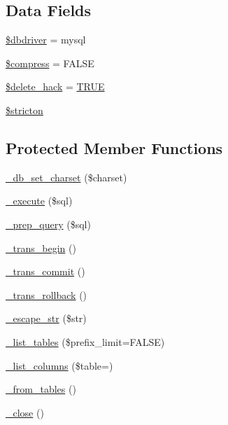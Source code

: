 \subsection*{Data Fields}
\begin{DoxyCompactItemize}
\item 
\mbox{\hyperlink{class_c_i___d_b__mysql__driver_a0cde2a16322a023d040aa7f725877597}{\$dbdriver}} = \textquotesingle{}mysql\textquotesingle{}
\item 
\mbox{\hyperlink{class_c_i___d_b__mysql__driver_abf799de0d30288b91ee73769281dd69d}{\$compress}} = F\+A\+L\+SE
\item 
\mbox{\hyperlink{class_c_i___d_b__mysql__driver_ad60008f32a478e978c7c3284f320f273}{\$delete\+\_\+hack}} = \mbox{\hyperlink{constants_8php_ae04a3efe6aa42044f803ee90c2277846}{T\+R\+UE}}
\item 
\mbox{\hyperlink{class_c_i___d_b__mysql__driver_afb42d9811bec1da94506e5764e1439e0}{\$stricton}}
\end{DoxyCompactItemize}
\subsection*{Protected Member Functions}
\begin{DoxyCompactItemize}
\item 
\mbox{\hyperlink{class_c_i___d_b__mysql__driver_a2b808d420d8e9fea0b73ad7127f5efb8}{\+\_\+db\+\_\+set\+\_\+charset}} (\$charset)
\item 
\mbox{\hyperlink{class_c_i___d_b__mysql__driver_a114ab675d89bf8324a41785fb475e86d}{\+\_\+execute}} (\$sql)
\item 
\mbox{\hyperlink{class_c_i___d_b__mysql__driver_a86af88ef0fa6d44ab4691e3f53270339}{\+\_\+prep\+\_\+query}} (\$sql)
\item 
\mbox{\hyperlink{class_c_i___d_b__mysql__driver_ac81ac882c1d54347d810199a15856aac}{\+\_\+trans\+\_\+begin}} ()
\item 
\mbox{\hyperlink{class_c_i___d_b__mysql__driver_a6fe7f373e0b11cfae23a5f41c0b35dda}{\+\_\+trans\+\_\+commit}} ()
\item 
\mbox{\hyperlink{class_c_i___d_b__mysql__driver_ad49a116b0776c26b53114c9093fd102a}{\+\_\+trans\+\_\+rollback}} ()
\item 
\mbox{\hyperlink{class_c_i___d_b__mysql__driver_af8ef0237bfcdb19215b63fff769e7a55}{\+\_\+escape\+\_\+str}} (\$str)
\item 
\mbox{\hyperlink{class_c_i___d_b__mysql__driver_a435c0f3ce54fe7daa178baa8532ebd54}{\+\_\+list\+\_\+tables}} (\$prefix\+\_\+limit=F\+A\+L\+SE)
\item 
\mbox{\hyperlink{class_c_i___d_b__mysql__driver_a7ccb7f9c301fe7f0a9db701254142b63}{\+\_\+list\+\_\+columns}} (\$table=\textquotesingle{}\textquotesingle{})
\item 
\mbox{\hyperlink{class_c_i___d_b__mysql__driver_aef43f7e3e7b71d337ff3724c5eb14f10}{\+\_\+from\+\_\+tables}} ()
\item 
\mbox{\hyperlink{class_c_i___d_b__mysql__driver_a4d9082658000e5ede8312067c6dda9db}{\+\_\+close}} ()
\end{DoxyCompactItemize}
